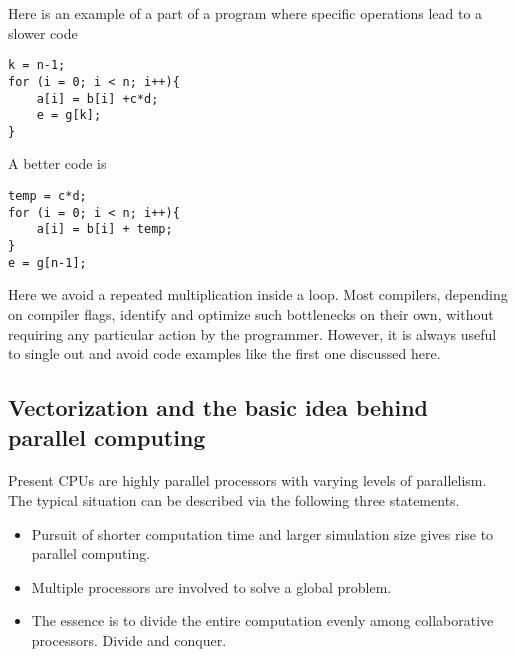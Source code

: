 \documentclass[%
oneside,                 %
final,                   %
10pt]{article}
\begin{document}
\noindent
Here is an example of a part of a program where specific operations lead to a slower code






\begin{verbatim}
k = n-1;
for (i = 0; i < n; i++){
    a[i] = b[i] +c*d;
    e = g[k];
}

\end{verbatim}

A better code is






\begin{verbatim}
temp = c*d;
for (i = 0; i < n; i++){
    a[i] = b[i] + temp;
}
e = g[n-1];

\end{verbatim}

Here we avoid a repeated multiplication inside a loop. 
Most compilers, depending on compiler flags, identify and optimize such bottlenecks on their own, without requiring any particular action by the programmer. However, it is always useful to single out and avoid code examples like the first one discussed here.



\subsection*{Vectorization and the basic idea behind parallel computing}

\paragraph{}
Present CPUs are highly parallel processors with varying levels of parallelism. The typical situation can be described via the following three statements.
\begin{itemize}
\item Pursuit of shorter computation time and larger simulation size gives rise to parallel computing.

\item Multiple processors are involved to solve a global problem.

\item The essence is to divide the entire computation evenly among collaborative processors.  Divide and conquer.
\end{itemize}
\end{document}
